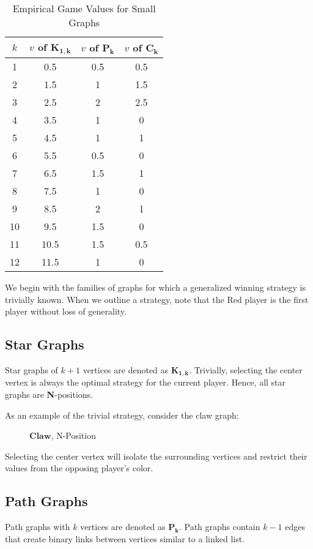 \documentclass{sig-alternate}
\newcommand\npos[0]{\textbf{N}}
\begin{document}
\begin{table}[ht!]
	\centering
	\begin{tabular}{| c | c | c | c |}
		\hline
		$k$ & $v$ of $\mathbf{K_{1,k}}$ & $v$ of $\mathbf{P_k}$ & $v$ of $\mathbf{C_k}$ \\\hline
		1	& 0.5	& 0.5	& 0.5	\\\hline
		2	& 1.5	& 1	 	& 1.5	\\\hline
		3	& 2.5	& 2	 	& 2.5	\\\hline
		4	& 3.5	& 1	 	& 0		\\\hline
		5	& 4.5	& 1	 	& 1		\\\hline
		6	& 5.5	& 0.5	& 0		\\\hline
		7	& 6.5	& 1.5	& 1		\\\hline
		8	& 7.5	& 1	 	& 0		\\\hline
		9	& 8.5	& 2	 	& 1		\\\hline
		10	& 9.5	& 1.5	& 0		\\\hline
		11	& 10.5	& 1.5	& 0.5	\\\hline
		12	& 11.5	& 1		& 0		\\\hline
	\end{tabular}
	\label{tab:emp}
	\caption{Empirical Game Values for Small Graphs}
\end{table}

We begin with the families of graphs for which a generalized winning strategy
is trivially known. When we outline a strategy, note that the Red player is the
first player without loss of generality.

	\subsection{Star Graphs}
	Star graphs of $k + 1$ vertices are denoted as $\mathbf{K_{1,k}}$.
	Trivially, selecting the center vertex is always the optimal strategy for
	the current player. Hence, all star graphs are \npos-positions.

	As an example of the trivial strategy, consider the claw graph:
	\begin{figure}[h]
		\centering
		\begin{tikzpicture}[node distance=3cm]
		
		\end{tikzpicture}
		\caption{$\mathbf{Claw}$, N-Position}
	\end{figure}
	Selecting the center vertex will isolate the surrounding vertices and
	restrict their values from the opposing player's color.

	\eject
	\subsection{Path Graphs}
	Path graphs with $k$ vertices are denoted as $\mathbf{P_{k}}$. Path
	graphs contain $k - 1$ edges that create binary links between
	vertices similar to a linked list.
	
\end{document}
